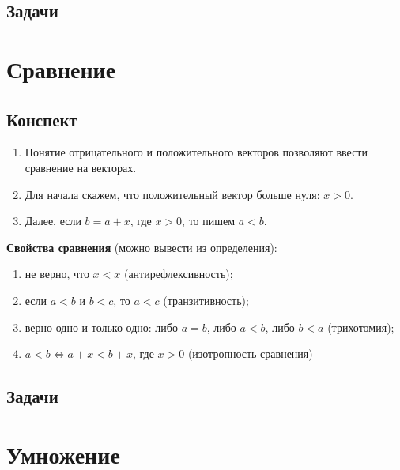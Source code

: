 \subsection{Задачи}




\section{Сравнение}

\subsection{Конспект}
\begin{enumerate}\setlength{\itemsep}{1pt}
\item Понятие отрицательного и положительного векторов позволяют ввести сравнение на векторах.
\item Для начала скажем, что положительный вектор больше нуля: $x>0$.
\item Далее, если $b=a+x$, где $x>0$, то пишем $a<b$.
\end{enumerate}

\textbf{Свойства сравнения} (можно вывести из определения):
\begin{enumerate}[Ord1]
\item не верно, что $x<x$ (антирефлексивность);
\item если $a<b$ и $b<c$, то $a<c$ (транзитивность);
\item верно одно и только одно: либо $a=b$, либо $a<b$, либо $b<a$ (трихотомия);
\item $a<b\Leftrightarrow a+x<b+x$, где $x>0$ (изотропность сравнения)
\end{enumerate}

\subsection{Задачи}






\section{Умножение}

